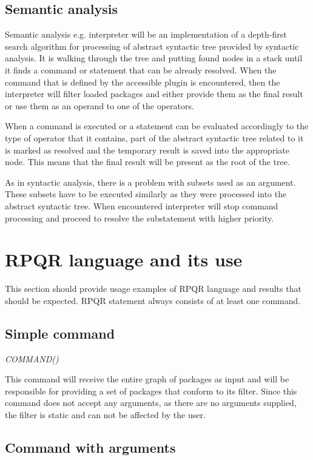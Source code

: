 \subsection*{Semantic analysis}
Semantic analysis e.g. interpreter will be an implementation of a depth-first search algorithm for processing
of abstract syntactic tree provided by syntactic analysis. It is walking through the tree and putting
found nodes in a stack until it finds a command or statement that can be already resolved. When the command
that is defined by the accessible plugin is encountered, then the interpreter will filter loaded packages and
either provide them as the final result or use them as an operand to one of the operators.

When a command is executed or a statement can be evaluated accordingly to the type of operator that it
contains, part of the abstract syntactic tree related to it is marked as resolved and the temporary result
is saved into the appropriate node. This means that the final result will be present as the root
of the tree.

As in syntactic analysis, there is a problem with subsets used as an argument. These subsets have
to be executed similarly as they were processed into the abstract syntactic tree. When encountered
interpreter will stop command processing and proceed to resolve the substatement with higher priority.

\section{RPQR language and its use}
This section should provide usage examples of RPQR language and results that should be expected.
RPQR statement always consists of at least one command.

\subsection*{Simple command}

\textit{COMMAND()}

This command will receive the entire graph of packages as input and will be responsible for providing
a set of packages that conform to its filter. Since this command does not accept any arguments, as there
are no arguments supplied, the filter is static and can not be affected by the user.

\subsection*{Command with arguments}

